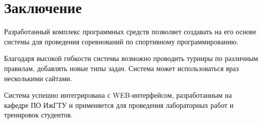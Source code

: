 \chapter{Заключение}
Разработанный комплекс программных средств позволяет создавать на его основе
системы для проведения соревнований по спортивному программированию.

Благодаря высокой гибкости системы возможно проводить турниры по различным правилам,
добавлять новые типы задач. Система может использоваться враз
несколькими сайтами.

Система успешно интегрирована с WEB-интерфейсом,
разработанным на кафедре ПО ИжГТУ и применяется
для проведения лабораторных работ и тренировок
студентов.
